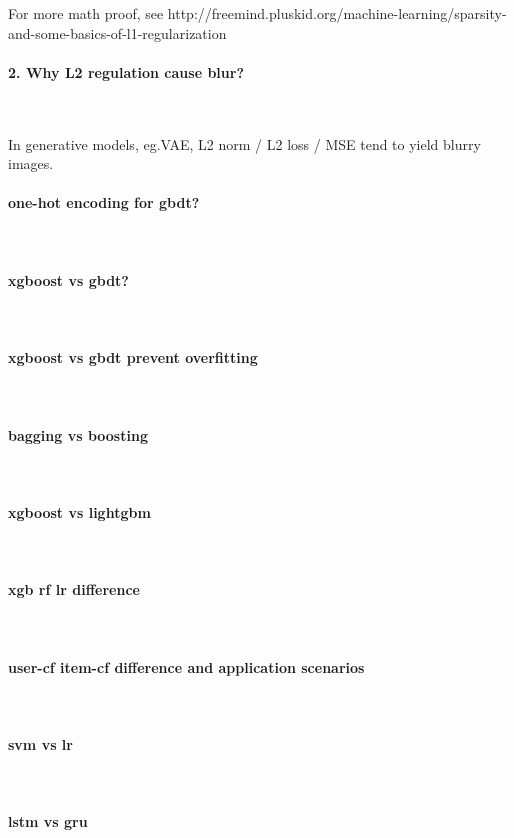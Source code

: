 \documentclass{article}
\begin{document}
For more math proof, see http://freemind.pluskid.org/machine-learning/sparsity-and-some-basics-of-l1-regularization

\paragraph{2. Why L2 regulation cause blur?}~{}

In generative models, eg.VAE, L2 norm / L2 loss / MSE tend to yield blurry images.  

\paragraph{one-hot encoding for gbdt?}~{}
\paragraph{xgboost vs gbdt?}~{}
\paragraph{xgboost vs gbdt prevent overfitting}~{}
\paragraph{bagging vs boosting}~{}
\paragraph{xgboost vs lightgbm}~{}
\paragraph{xgb rf lr difference}~{}
\paragraph{user-cf item-cf difference and application scenarios}~{}
\paragraph{svm vs lr}~{}
\paragraph{lstm vs gru}~{}
\end{document}
